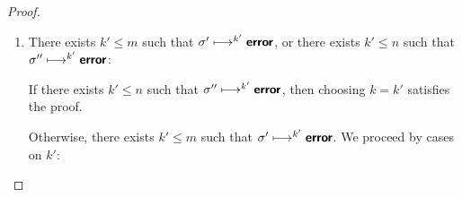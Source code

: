 \begin{proof}
\begin{enumerate}
\begin{itemize}
      From $\conf' \ctxstepsto \conf'''$ and $\conf' \ctxstepsto^{i'}
      \conf_c'$ and Lemma~\ref{lem:strong-one-sided-quasi-confluence},
      one of the following two cases is true:
      \begin{enumerate}
        \item There exist $\conf_c''$ and $i''$ and $j''$ such that
          $\conf''' \ctxstepsto^{i''} \conf_c''$ and $\conf_c'
          \ctxstepsto^{j''} \conf_c''$ and $i'' \leq i'$ and $j'' \leq
          1$.  So we also have $\conf'' \ctxstepsto^{j'} \conf_c'
          \ctxstepsto^{j''} \conf_c''$.  In summary, we pick $\conf_c
          = \conf_c''$ and $i = i''$ and $j = j' + j''$, which is
          sufficient because $i = i'' \leq i' \leq m$ and $j = j' +
          j'' \leq n + 1$.
        \item There exists $k'' \leq i'$ such that $\conf'''
          \ctxstepsto^{k''} \error$, or there exists $k'' \leq 1$ such
          that $\conf'_c \ctxstepsto^{k''} \error$.

          If there exists $k'' \leq i'$ such that $\conf'''
          \ctxstepsto^{k''} \error$, then choosing $k = k''$ satisfies
          the proof, since $k'' \leq i' \leq m$.

          Otherwise, there exists $k'' \leq 1$ such
          that $\conf'_c \ctxstepsto^{k''} \error$.

          Therefore, $\conf'' \ctxstepsto^{j'} \conf_c'
          \ctxstepsto^{k''} \error$.

          Hence $\conf'' \ctxstepsto^{j' + k''} \error$.

          Since $j' \leq n$ and $k'' \leq 1$, $j' + k'' \leq n + 1$.

          Hence choosing $k = j' + k''$ satisfies the proof.

      \end{enumerate}
    \end{itemize}

  \item There exists $k' \leq m$ such that $\sigma' \longmapsto^{k'}
    \textbf{\textsf{error}}$, or there exists $k' \leq n$ such that $\sigma''
    \longmapsto^{k'} \textbf{\textsf{error}}$:

    If there exists $k' \leq n$ such that $\sigma'' \longmapsto^{k'}
    \textbf{\textsf{error}}$, then choosing $k = k'$ satisfies the proof.

    Otherwise, there exists $k' \leq m$ such that $\sigma'
    \longmapsto^{k'} \textbf{\textsf{error}}$.  We proceed by cases on $k'$:

    \begin{itemize}


\end{itemize}
\end{enumerate}
\end{proof}

